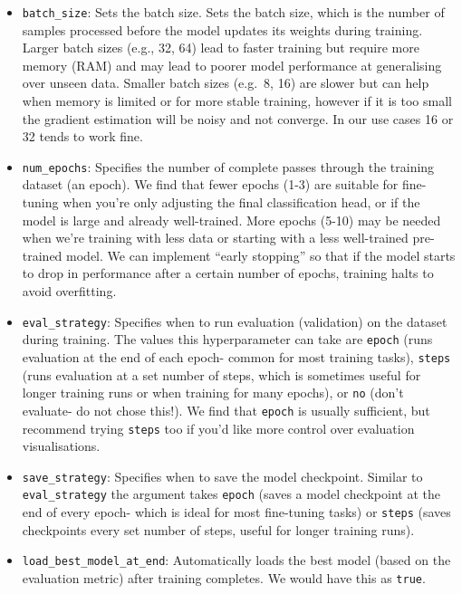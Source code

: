 \documentclass[
  letterpaper,
  DIV=11,
  numbers=noendperiod]{scrreprt}
\providecommand{\tightlist}{%
  \setlength{\itemsep}{0pt}\setlength{\parskip}{0pt}}\usepackage{longtable,booktabs,array}
\begin{document}
\begin{itemize}
\tightlist
\item
  \texttt{batch\_size}: Sets the batch size. Sets the batch size, which
  is the number of samples processed before the model updates its
  weights during training. Larger batch sizes (e.g., 32, 64) lead to
  faster training but require more memory (RAM) and may lead to poorer
  model performance at generalising over unseen data. Smaller batch
  sizes (e.g.~8, 16) are slower but can help when memory is limited or
  for more stable training, however if it is too small the gradient
  estimation will be noisy and not converge. In our use cases 16 or 32
  tends to work fine.
\item
  \texttt{num\_epochs}: Specifies the number of complete passes through
  the training dataset (an epoch). We find that fewer epochs (1-3) are
  suitable for fine-tuning when you're only adjusting the final
  classification head, or if the model is large and already
  well-trained. More epochs (5-10) may be needed when we're training
  with less data or starting with a less well-trained pre-trained model.
  We can implement ``early stopping'' so that if the model starts to
  drop in performance after a certain number of epochs, training halts
  to avoid overfitting.
\item
  \texttt{eval\_strategy}: Specifies when to run evaluation (validation)
  on the dataset during training. The values this hyperparameter can
  take are \texttt{epoch} (runs evaluation at the end of each epoch-
  common for most training tasks), \texttt{steps} (runs evaluation at a
  set number of steps, which is sometimes useful for longer training
  runs or when training for many epochs), or \texttt{no} (don't
  evaluate- do not chose this!). We find that \texttt{epoch} is usually
  sufficient, but recommend trying \texttt{steps} too if you'd like more
  control over evaluation visualisations.
\item
  \texttt{save\_strategy}: Specifies when to save the model checkpoint.
  Similar to \texttt{eval\_strategy} the argument takes \texttt{epoch}
  (saves a model checkpoint at the end of every epoch- which is ideal
  for most fine-tuning tasks) or \texttt{steps} (saves checkpoints every
  set number of steps, useful for longer training runs).
\item
  \texttt{load\_best\_model\_at\_end}: Automatically loads the best
  model (based on the evaluation metric) after training completes. We
  would have this as \texttt{true}.
\end{itemize}
\end{document}
